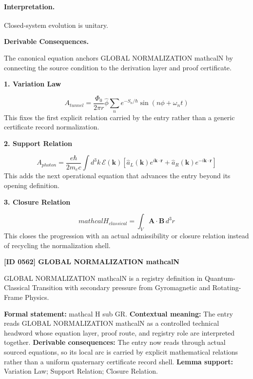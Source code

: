 \paragraph{Interpretation.}
Closed-system evolution is unitary.

\par\vspace{0.35em}
\noindent\textbf{Derivable Consequences.}\quad
\begingroup
\footnotesize
\raggedright
The canonical equation anchors GLOBAL NORMALIZATION mathcalN by connecting the source condition to the derivation layer and proof certificate.
\par\endgroup

\noindent\textbf{1. Variation Law}\par
\[
A_{tunnel} = \frac{\Phi_0}{2\pi r}\hat{\phi} \sum_n e^{-S_n/\hbar}\sin(n\phi + \omega_n t)
\]
\noindent This fixes the first explicit relation carried by the entry rather than a generic certificate record normalization.\par
\noindent\textbf{2. Support Relation}\par
\[
A_{photon} = \frac{e\hbar}{2m_e c}\int d^3k \, \mathcal{E}(\mathbf{k})\left[\hat{a}_L(\mathbf{k})e^{i\mathbf{k}\cdot\mathbf{r}} + \hat{a}_R(\mathbf{k})e^{-i\mathbf{k}\cdot\mathbf{r}}\right]
\]
\noindent This adds the next operational equation that advances the entry beyond its opening definition.\par
\noindent\textbf{3. Closure Relation}\par
\[
mathcal{H}_{classical} = \int_V \mathbf{A} \cdot \mathbf{B} \, d^3r
\]
\noindent This closes the progression with an actual admissibility or closure relation instead of recycling the normalization shell.\par

\clearpage
\noindent\textbf{[ID 0562] GLOBAL NORMALIZATION mathcalN}\par
\vspace{0.35em}
\begingroup\small
{}
GLOBAL NORMALIZATION mathcalN is a registry definition in Quantum-Classical Transition with secondary pressure from Gyromagnetic and Rotating-Frame Physics.

\begingroup\footnotesize\setlength{\emergencystretch}{3em}\sloppy
\textbf{Formal statement:} mathcal H sub GR. \textbf{Contextual meaning:} The entry reads GLOBAL NORMALIZATION mathcalN as a controlled technical headword whose equation layer, proof route, and registry role are interpreted together. \textbf{Derivable consequences:} The entry now reads through actual sourced equations, so its local arc is carried by explicit mathematical relations rather than a uniform quaternary certificate record shell. \textbf{Lemma support:} Variation Law; Support Relation; Closure Relation.\par
\endgroup

